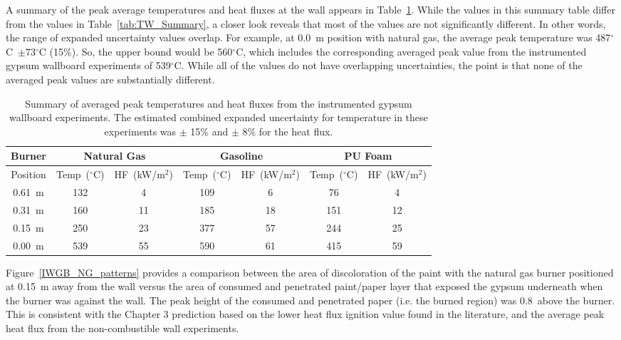 \documentclass[twoside]{uocthesis}
\begin{document}
{A summary of the peak average temperatures and heat fluxes at the wall appears in Table~\ref{tab:IWGB_Summary}. While the values in this summary table differ from the values in Table~\ref{tab:TW_Summary}, a closer look reveals that most of the values are not significantly different.  In other words, the range of expanded uncertainty values overlap.  For example, at 0.0~m position with natural gas, the average peak temperature was 487$^\circ$C~$\pm$73$^\circ$C (15\%). So, the upper bound would be 560$^\circ$C, which includes the corresponding averaged peak value from the instrumented gypsum wallboard experiments of 539$^\circ$C.  While all of the values do not have overlapping uncertainties, the point is that none of the averaged peak values are substantially different.        

\begin{table}
	\centering
	\scriptsize
	\begin{tabular}{|c|c|c|c|c|c|c|}
		\hline {Burner} & \multicolumn{2}{c}{Natural Gas} & \multicolumn{2}{c}{Gasoline} & \multicolumn{2}{c|}{PU Foam} \\
		\hline  Position & Temp~($^\circ$C) & HF~(kW/m$^{2}$) & Temp~($^\circ$C) & HF~(kW/m$^{2}$) & Temp~($^\circ$C) & HF~(kW/m$^{2}$) 	\\
		\hline \hline 0.61~m & 132 & 4 & 109 & 6 & 76 & 4 \\
		\hline 0.31~m & 160 & 11 & 185 & 18 & 151 & 12	\\
		\hline 0.15~m & 250 & 23 & 377 & 57 & 244 & 25	\\
		\hline 0.00~m & 539 & 55 & 590 & 61 & 415 & 59 	\\
		\hline
	\end{tabular}
	\caption[Summary of instrumented gypsum wallboard experiments]{Summary of averaged peak temperatures and heat fluxes from the instrumented gypsum wallboard experiments.  The estimated combined expanded uncertainty for temperature in these experiments was $\pm$ 15\% and $\pm$ 8\% for the heat flux.} 
	\label{tab:IWGB_Summary}
\end{table}

Figure~\ref{IWGB_NG_patterns} provides a comparison between the area of discoloration of the paint with the natural gas burner positioned at 0.15~m away from the wall versus the area of consumed and penetrated paint/paper layer that exposed the gypsum underneath when the burner was against the wall. The peak height of the consumed and penetrated paper (i.e. the burned region) was 0.8~above the burner.  This is consistent with the Chapter 3 prediction based on the lower heat flux ignition value found in the literature, and the average peak heat flux from the non-combustible wall experiments. 

}
\end{document}
